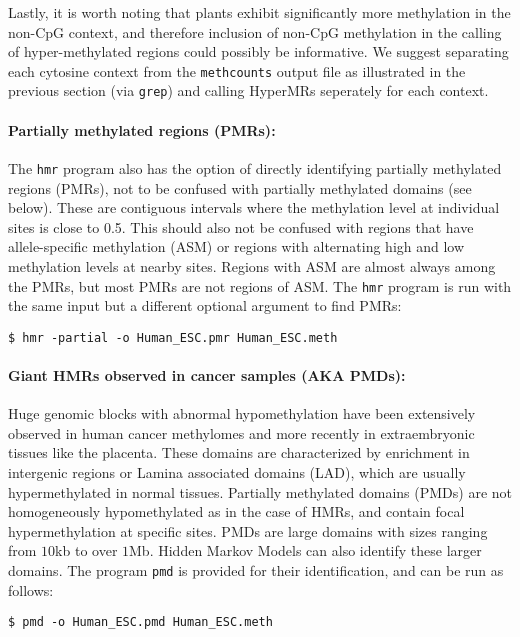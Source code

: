 \documentclass[10pt]{article}
\newcommand{\prog}[1]{\texttt{#1}}
\begin{document}
Lastly, it is worth noting that plants exhibit significantly more
methylation in the non-CpG context, and therefore inclusion of non-CpG
methylation in the calling of hyper-methylated regions could possibly
be informative. We suggest separating each cytosine context from the
\prog{methcounts} output file as illustrated in the previous section
(via \prog{grep}) and calling HyperMRs seperately for each context.

\paragraph{Partially methylated regions (PMRs):}
The \prog{hmr} program also has the option of directly identifying
partially methylated regions (PMRs), not to be confused with partially
methylated domains (see below). These are contiguous intervals where
the methylation level at individual sites is close to 0.5. This should
also not be confused with regions that have allele-specific
methylation (ASM) or regions with alternating high and low methylation
levels at nearby sites. Regions with ASM are almost always among the
PMRs, but most PMRs are not regions of ASM. The \prog{hmr} program is
run with the same input but a different optional argument to find
PMRs:
\begin{verbatim}
$ hmr -partial -o Human_ESC.pmr Human_ESC.meth
\end{verbatim}

\paragraph{Giant HMRs observed in cancer samples (AKA PMDs):}

Huge genomic blocks with abnormal hypomethylation have been
extensively observed in human cancer methylomes and more recently in
extraembryonic tissues like the placenta. These domains are
characterized by enrichment in intergenic regions or Lamina associated
domains (LAD), which are usually hypermethylated in normal
tissues. Partially methylated domains (PMDs) are not homogeneously
hypomethylated as in the case of HMRs, and contain focal
hypermethylation at specific sites. PMDs are large domains with sizes
ranging from $10$kb to over $1$Mb.  Hidden Markov Models can also
identify these larger domains. The program \prog{pmd} is provided for
their identification, and can be run as follows:

\begin{verbatim}
$ pmd -o Human_ESC.pmd Human_ESC.meth
\end{verbatim}
\end{document}
